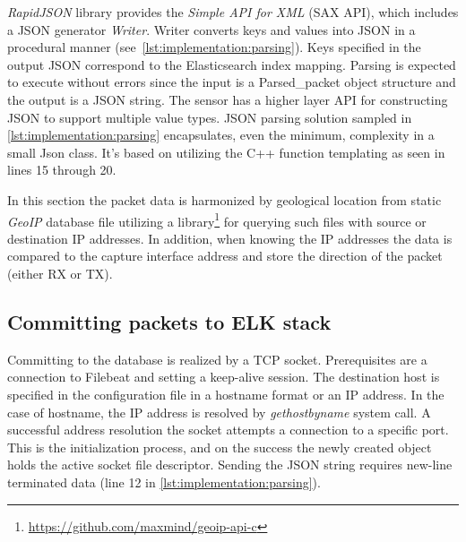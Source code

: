 \documentclass[12pt,a4paper,twoside]{book}
\begin{document}
            \emph{RapidJSON} library provides the \emph{Simple API for XML} (SAX API), which includes a JSON generator \emph{Writer}. Writer converts keys and values into JSON in a procedural manner (see~\autoref{lst:implementation:parsing}). Keys specified in the output JSON correspond to the Elasticsearch index mapping. Parsing is expected to execute without errors since the input is a Parsed\_packet object structure and the output is a JSON string. The sensor has a higher layer API for constructing JSON to support multiple value types. JSON parsing solution sampled in \autoref{lst:implementation:parsing} encapsulates, even the minimum, complexity in a small Json class. It's based on utilizing the C++ function templating as seen in lines 15 through 20.
            
            In this section the packet data is harmonized by geological location from static \emph{GeoIP} database file utilizing a library\footnote{\url{https://github.com/maxmind/geoip-api-c}} for querying such files with source or destination IP addresses. In addition, when knowing the IP addresses the data is compared to the capture interface address and store the direction of the packet (either RX or TX).
        \subsection{Committing packets to ELK stack} \label{implementation:sensor:commit}
            Committing to the database is realized by a TCP socket. Prerequisites are a connection to Filebeat and setting a keep-alive session. The destination host is specified in the configuration file in a hostname format or an IP address. In the case of hostname, the IP address is resolved by \emph{gethostbyname} system call. A successful address resolution the socket attempts a connection to a specific port. This is the initialization process, and on the success the newly created object holds the active socket file descriptor. Sending the JSON string requires new-line terminated data (line 12 in \autoref{lst:implementation:parsing}).    
\end{document}
